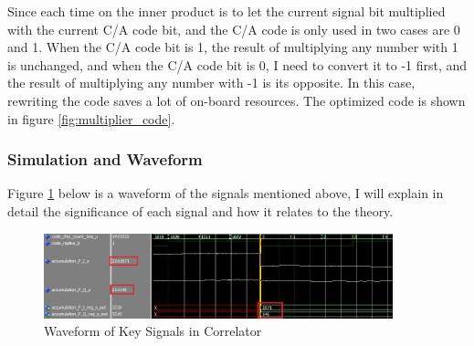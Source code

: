Since each time on the inner product is to let the current signal bit multiplied with the current C/A code bit, and the C/A code is only used in two cases are 0 and 1. When the C/A code bit is 1, the result of multiplying any number with 1 is unchanged, and when the C/A code bit is 0, I need to convert it to -1 first, and the result of multiplying any number with -1 is its opposite. In this case, rewriting the code saves a lot of on-board resources. The optimized code is shown in figure \ref{fig:multiplier_code}.


% 

\subsubsection{Simulation and Waveform}
Figure \ref{fig:correlator_wave} below is a waveform of the signals mentioned above, I will explain in detail the significance of each signal and how it relates to the theory.

\begin{figure}[!htbp]
    \centering
    \includegraphics[width=0.9\textwidth]{_IMAGES/correlator_wave.png}
    \caption{Waveform of Key Signals in Correlator}
    \label{fig:correlator_wave}
\end{figure}

